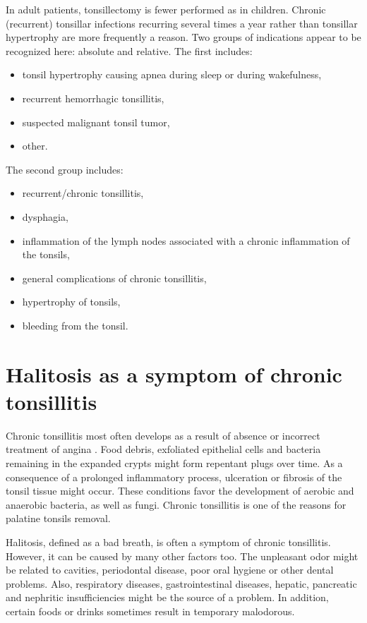 \documentclass[12pt,a4paper,notitlepage]{report}
\begin{document}
In adult patients, tonsillectomy is fewer performed as in children. Chronic (recurrent) tonsillar infections recurring several times a year rather than tonsillar hypertrophy are more frequently a reason. Two groups of indications appear to be recognized here: absolute and relative\cite{Niedzielska03,WongChung18}. The first includes: 
\begin{itemize}
	\item tonsil hypertrophy causing apnea during sleep or during wakefulness, 
	\item recurrent hemorrhagic tonsillitis, 
	\item suspected malignant tonsil tumor,
	\item other.
\end{itemize}
The second group includes: 
\begin{itemize}
	\item recurrent/chronic tonsillitis, 
	\item dysphagia, 
	\item inflammation of the lymph nodes associated with a chronic inflammation of the tonsils, 
	\item general complications of chronic tonsillitis, 
	\item hypertrophy of tonsils, 
	\item bleeding from the tonsil.
\end{itemize}


\section{Halitosis as a symptom of chronic tonsillitis}

Chronic tonsillitis most often develops as a result of absence or incorrect treatment of angina \cite{Bochnia05}. Food debris, exfoliated epithelial cells and bacteria remaining in the expanded crypts might form repentant plugs over time. As a consequence of a prolonged inflammatory process, ulceration or fibrosis of the tonsil tissue might occur. These conditions favor the development of aerobic and anaerobic bacteria, as well as fungi. Chronic tonsillitis is one of the reasons for palatine tonsils removal.

Halitosis, defined as a bad breath, is often a symptom of chronic tonsillitis. However, it can be caused by many other factors too. The unpleasant odor might be related to cavities, periodontal disease, poor oral hygiene or other dental problems. Also, respiratory diseases, gastrointestinal diseases, hepatic, pancreatic and nephritic insufficiencies might be the source of a problem. In addition, certain foods or drinks sometimes result in temporary malodorous.
\end{document}
